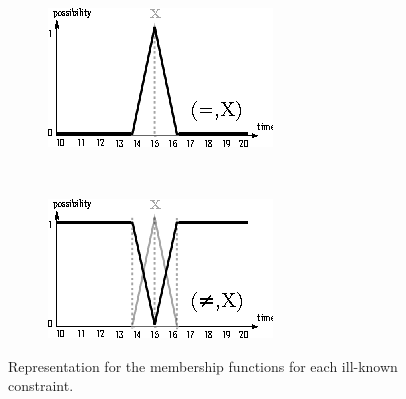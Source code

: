 \documentclass{llncs}
\begin{document}
\begin{figure}
\begin{subfigure}[b]{0.3\textwidth}
  \centering
  \includegraphics[width=\textwidth]{graphs/eq.eps}
\end{subfigure}
~
\begin{subfigure}[b]{0.3\textwidth}
  \centering
  \includegraphics[width=\textwidth]{graphs/neq.eps}
\end{subfigure}
\caption{Representation for the membership functions for each ill-known constraint.}
\end{figure}
\end{document}
